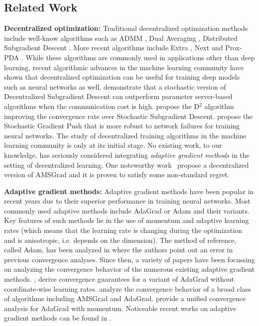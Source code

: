 \documentclass{article} %
\begin{document}
\subsection{Related Work}
\textbf{Decentralized optimization:} 
Traditional decentralized optimization methods include well-know algorithms such as ADMM \citep{boyd2011distributed}, Dual Averaging \citep{duchi2011dual}, Distributed Subgradient Descent \citep{nedic2009distributed}. 
More recent algorithms include Extra \citep{shi2015extra}, Next \citep{di2016next} and Prox-PDA \citep{hong2017prox}.  
While these algorithms are commonly used in applications other than deep learning, recent algorithmic advances in the machine learning community have shown that decentralized optimization can be useful for training deep models such as neural networks as well. 
\citet{lian2017can} demonstrate that a stochastic version of Decentralized Subgradient Descent can outperform parameter server-based algorithms when the communication cost is high. 
\citet{tang2018d} propose the D$^2$ algorithm improving the convergence rate over Stochastic Subgradient Descent.
\citet{assran2019stochastic} propose the Stochastic Gradient Push that is more robust to network failures for training neural networks. 
The study of decentralized training algorithms in the machine learning community is only at its initial stage. 
No existing work, to our knowledge, has seriously considered integrating \emph{adaptive gradient methods} in the setting of decentralized learning.
One noteworthy work~\citep{nazari2019dadam} propose a decentralized version of AMSGrad \citep{reddi2019convergence} and it is proven to satisfy some non-standard regret.


\textbf{Adaptive gradient methods:}  
Adaptive gradient methods have been popular in recent years due to their superior performance in training neural networks. 
Most commonly used adaptive methods include AdaGrad \citep{duchi2011adaptive} or Adam \citep{kingma2014adam} and their variants.  
Key features of such methods lie in the use of momentum and adaptive learning rates (which means that the learning rate is changing during the optimization and is anisotropic, i.e. depends on the dimension).
The method of reference, called Adam, has been analyzed in \citet{reddi2019convergence} where the authors point out an error in previous convergence analyses. 
Since then, a variety of papers have been focussing on analyzing the convergence behavior of the numerous existing adaptive gradient methods. 
\citet{ward2018adagrad}, \citet{li2018convergence} derive convergence guarantees for a variant of AdaGrad without coordinate-wise learning rates. 
\citet{chen2018convergence} analyze the convergence behavior of a broad class of algorithms including AMSGrad and AdaGrad. 
\citet{zou2018convergence} provide a unified convergence analysis for AdaGrad with momentum.
Noticeable recent works on adaptive gradient methods can be found in \citet{agarwal2018case,luo2019adaptive,zaheer2018adaptive}.  
\end{document}
